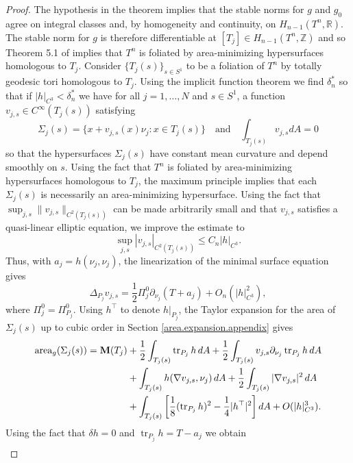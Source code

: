 \documentclass[11pt]{amsart}
\def\R{\mathbb R}
\def\Z{\mathbb Z}
\def\tr{\operatorname{tr}}
\theoremstyle{remark}
\theoremstyle{definition}
\begin{document}
\begin{proof}
		The hypothesis in the theorem implies that  the stable norms for $g$ and $g_0$ agree on integral classes and, by homogeneity and continuity, on $H_{n-1}(T^n,\R)$. The stable norm for $g$ is therefore differentiable at $[T_{j}]\in H_{n-1}(T^n,\Z)$ and so Theorem 5.1 of \cite{cgn} implies that $T^n$ is foliated by area-minimizing hypersurfaces homologous to $T_j$.  Consider   $\{T_{j}(s)\}_{s\in S^1}$ to be a foliation of  $T^n$ by totally geodesic tori homologous to $T_j$. Using the implicit function theorem we find $\delta^*_n$ so that if $|h|_{C^3}<\delta^*_n$  we have for all $j=1,\ldots,N$ and $s\in S^1$, a function  $v_{j,s}\in C^{\infty}(T_{j}(s))$ satisfying
		$$
		\Sigma_{j}(s)=\{x+v_{j,s}(x)\nu_j:x\in T_{j}(s)\}\quad\text{and}\quad \int_{T_{j}(s)}v_{j,s}dA=0
		$$
		so that the hypersurfaces $\Sigma_j(s)$ have constant mean curvature and depend smoothly on $s$. Using the fact that $T^n$ is foliated by area-minimizing hypersurfaces homologous to $T_j$, the maximum principle implies that each $\Sigma_j(s)$ is necessarily an area-minimizing hypersurface. Using the fact that $\sup_{j,s}\|v_{j,s}\|_{C^2(T_{j}(s))}$ can be made arbitrarily small and that  $v_{j,s}$ satisfies a quasi-linear elliptic equation, we improve the estimate to 
		$$\sup_{j,s}|v_{j,s}|_{C^2(T_{j}(s))}\leq C_n|h|_{C^3}.$$
		Thus, with  $a_j=h(\nu_j,\nu_j)$, the linearization of the minimal surface  equation gives
		\begin{equation}\label{EL:equation}
			\Delta_{P_j}v_{j,s}=\frac12\Pi_j^0\partial_{\nu_j}(T+a_j)+O_n(|h|^2_{C^3}),
		\end{equation}
		where  $\Pi_j^0=\Pi^0_{P_j}$.
		Using $h^\top$ to denote {$h|_{P_j}$,} the Taylor expansion for the area of $\Sigma_{j}(s)$ up to cubic order in Section \ref{area.expansion.appendix} gives
		\begin{equation}\label{cubic.order}
			\begin{aligned}
				\text{area}_g(\Sigma_j(s))={\bf M}(T_j)&+\frac12\int_{T_{j}(s)}\tr _{P_j} h\,dA+\frac12\int_{T_{j}(s)}v_{j,s}\partial_{\nu_j}\tr _{P_j} h\,dA\\
				&+\int_{T_{j}(s)} h(\nabla v_{j,s},\nu_j)\,dA+\frac12\int_{T_{j}(s)}|\nabla v_{j,s}|^2\,dA\\
				&+\int_{T_{j}(s)}\left[\frac18(\tr _{P_j} h)^2-\frac14|h^\top|^2\right]dA+O(|h|_{C^3}^3).
			\end{aligned}
		\end{equation}
		Using the fact that $\delta h=0$  and  $\tr _{P_j} h=T-a_j$ we obtain
		\begin{multline*}

\end{multline*}
\end{proof}
\end{document}
